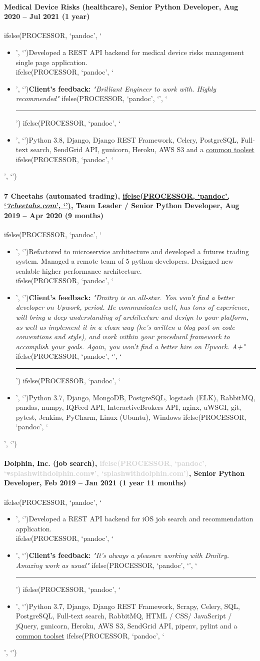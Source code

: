 \documentclass[a4paper,8pt]{extarticle}
\newcommand{\chref}[2]{\href{#1}
{ifelse(PROCESSOR, `pandoc', `#2', `\underline{\smash{#2}}')}}
\newcommand{\itchref}[2]{\chref{#1}{\textit{#2}}}  %
\newcommand{\chrule}{ifelse(PROCESSOR, `pandoc', `', `\vspace{3pt}\hrule')}
\newcommand{\brokenhreflg}[1]{\textcolor{lightgray}{ifelse(PROCESSOR, `pandoc', `♥#1♥', `#1')}}
\newcommand{\pdbeginitemize}{ifelse(PROCESSOR, `pandoc', `\begin{itemize}', `')}
\newcommand{\pditem}{ifelse(PROCESSOR, `pandoc', `\item', `')}
\newcommand{\pdenditemize}{ifelse(PROCESSOR, `pandoc', `\end{itemize}', `')}
\begin{document}
\paragraph*{Medical Device Risks (healthcare), Senior Python Developer, Aug 2020 -- Jul 2021 (1 year)}
\pdbeginitemize
\pditem Developed a REST API backend for medical device risks management single page application.\\
\pditem \textbf{Client's feedback:} \textit{"Brilliant Engineer to work with. Highly recommended"}
\chrule
\pditem Python 3.8, Django, Django REST Framework, Celery, PostgreSQL, Full-text search, SendGrid API, gunicorn, Heroku, AWS S3 and a \hyperlink{common-toolset}{common toolset}
\pdenditemize

\pagebreak

\paragraph*{7 Cheetahs (automated trading), \itchref{https://7cheetahs.com}{7cheetahs.com}, Team Leader / Senior Python Developer, Aug 2019 -- Apr 2020 (9 months)}
\pdbeginitemize
\pditem Refactored to microservice architecture and developed a futures trading system. Managed a remote team of 5 python developers. Designed new scalable higher performance architecture.\\
\pditem \textbf{Client's feedback:} \textit{"Dmitry is an all-star. You won't find a better developer on Upwork, period. He communicates well, has tons of experience, will bring a deep understanding of architecture and design to your platform, as well as implement it in a clean way (he's written a blog post on code conventions and style), and work within your procedural framework to accomplish your goals. Again, you won't find a better hire on Upwork. A+"}
\chrule
\pditem Python 3.7, Django, MongoDB, PostgreSQL, logstash (ELK), RabbitMQ, pandas, numpy, IQFeed API, InteractiveBrokers API, nginx, uWSGI, git, pytest, Jenkins, PyCharm, Linux (Ubuntu), Windows
\pdenditemize

\paragraph*{Dolphin, Inc. (job search), \brokenhreflg{splashwithdolphin.com}, Senior Python Developer, Feb 2019 -- Jan 2021 (1 year 11 months)}
\pdbeginitemize
\pditem Developed a REST API backend for iOS job search and recommendation application.\\
\pditem \textbf{Client's feedback:} \textit{"It's always a pleasure working with Dmitry. Amazing work as usual"}
\chrule
\pditem Python 3.7, Django, Django REST Framework, Scrapy, Celery, SQL, PostgreSQL, Full-text search, RabbitMQ, HTML / CSS/ JavaScript / jQuery, gunicorn, Heroku, AWS S3, SendGrid API, pipenv, pylint and a \hyperlink{common-toolset}{common toolset}
\pdenditemize
\end{document}
